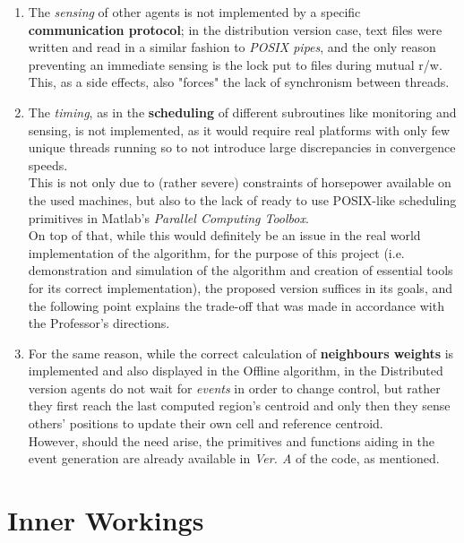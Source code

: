 \documentclass[a4paper,11pt,oneside]{book}
\begin{document}
	\begin{enumerate}
		\item The \textit{sensing} of other agents is not implemented by a specific \textbf{communication protocol}; in the distribution version case, text files were written and read in a similar fashion to \textit{POSIX pipes}, and the only reason preventing an immediate sensing is the lock put to files during mutual r/w.\\This, as a side effects, also "forces" the lack of synchronism between threads.
		
		\item The \textit{timing}, as in the \textbf{scheduling} of different subroutines like monitoring and sensing, is not implemented, as it would require real platforms with only few unique threads running so to not introduce large discrepancies in convergence speeds.\\
		This is not only due to (rather severe) constraints of horsepower available on the used machines, but also to the lack of ready to use POSIX-like scheduling primitives in Matlab's \textit{Parallel Computing Toolbox}.\\
		On top of that, while this would definitely be an issue in the real world implementation of the algorithm, for the purpose of this project (i.e. demonstration and simulation of the algorithm and creation of essential tools for its correct implementation), the proposed version suffices in its goals, and the following point explains the trade-off that was made in accordance with the Professor's directions.
		
		\item For the same reason, while the correct calculation of \textbf{neighbours weights} is implemented and also displayed in the Offline algorithm, in the Distributed version agents do not wait for \textit{events} in order to change control, but rather they first reach the last computed region's centroid and only then they sense others' positions to update their own cell and reference centroid.\\
		However, should the need arise, the primitives and functions aiding in the event generation are already available in \emph{Ver. A} of the code, as mentioned.
		
		
	\end{enumerate}
	
	
	
	
	\section{Inner Workings}
\end{document}
